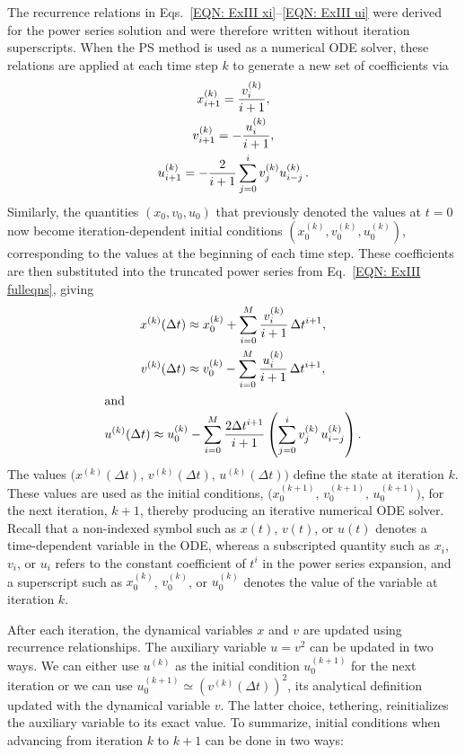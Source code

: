 \documentclass{article}
\begin{document}
The recurrence relations in Eqs.~\eqref{EQN: ExIII xi}--\eqref{EQN: ExIII ui} were derived for the power series solution and were therefore written without iteration superscripts. When the PS method is used as a numerical ODE solver, these relations are applied at each time step $k$ to generate a new set of coefficients via
    \begin{gather}
        x_{i+1}^{(k)}=\frac{v_i^{(k)}}{i+1}, \label{eqn:EXIII xi ODE solver} \\
        v_{i+1}^{(k)}=-\frac{u_i^{(k)}}{i+1}, \label{eqn:EXIII vi ODE solver} \\
        u_{i+1}^{(k)}=-\frac{2}{i+1}\sum_{j=0}^i v_j^{(k)}u_{i-j}^{(k)}\label{eqn:EXIII ui ODE solver}\thinspace.
    \end{gather}
Similarly, the quantities $(x_{0},v_{0},u_{0})$ that previously denoted the values at $t=0$ now become iteration-dependent initial conditions $(x_{0}^{(k)},v_{0}^{(k)},u_{0}^{(k)})$, corresponding to the values at the beginning of each time step. These coefficients are then substituted into the truncated power series from Eq.~\eqref{EQN: ExIII fulleqns}, giving
       \begin{gather}
        x^{(k)}(\Delta t) \approx x_0^{(k)} + \sum_{i=0}^{M} \frac{v_i^{(k)}}{i+1}\,\Delta t^{i+1}, \label{eqn:EXIII x ODE solver}\\
        v^{(k)}(\Delta t) \approx v_0^{(k)} - \sum_{i=0}^{M} \frac{u_i^{(k)}}{i+1}\,\Delta t^{i+1}, \label{eqn:EXIII v ODE solver}\\
\intertext{and}
        u^{(k)}(\Delta t) \approx u_0^{(k)} - \sum_{i=0}^{M} \frac{2\Delta t^{i+1}}{i+1}
        \left(\sum_{j=0}^{i} v_j^{(k)}\,u_{i-j}^{(k)}\right).\label{eqn:EXIII u ODE solver}
    \end{gather}
The values $\big(x^{(k)}(\Delta t),\,v^{(k)}(\Delta t),\,u^{(k)}(\Delta t)\big)$ define the state at iteration $k$. These values are used as the initial conditions, $\big(x_0^{(k+1)},\, v_0^{(k+1)}, \,u_0^{(k+1)}\big)$, for the next iteration, $k+1$, thereby producing an iterative numerical ODE solver. Recall that a non-indexed symbol such as $x(t)$, $v(t)$, or $u(t)$  denotes a time-dependent variable in the ODE, whereas a subscripted quantity  such as $x_i$, $v_i$, or $u_i$ refers to the constant coefficient of $t^i$ in the power series expansion, and a superscript such as $x_0^{(k)}$, $v_0^{(k)}$, or $u_0^{(k)}$
denotes the value of the variable at iteration $k$.

After each iteration, the dynamical variables $x$ and $v$ are updated using recurrence relationships. The auxiliary variable $u=v^2$ can be updated in two ways. We can either use $u^{(k)}$ as the initial condition $u_0^{(k+1)}$ for the next iteration or we can use $u_0^{(k+1)}\simeq(v^{(k)}(\Delta t ))^2$, its analytical definition updated with the dynamical variable $v$. The latter choice, tethering, reinitializes the auxiliary variable to its exact value. To summarize, initial conditions when advancing from iteration $k$ to $k+1$ can be done in two ways:\\
\end{document}
